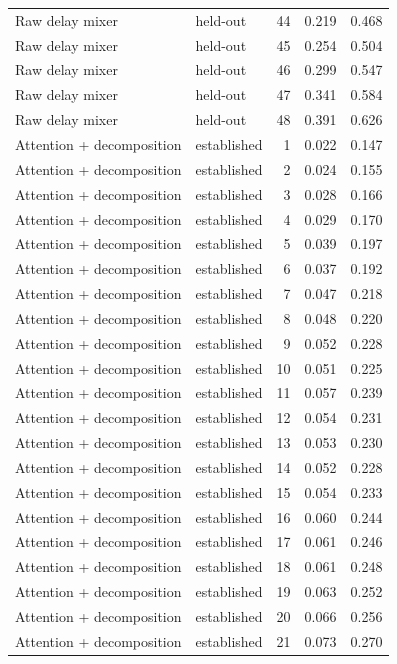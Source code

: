 \begin{tabular}{llrrr}
Raw delay mixer & held-out & 44 & 0.219 & 0.468 \\
Raw delay mixer & held-out & 45 & 0.254 & 0.504 \\
Raw delay mixer & held-out & 46 & 0.299 & 0.547 \\
Raw delay mixer & held-out & 47 & 0.341 & 0.584 \\
Raw delay mixer & held-out & 48 & 0.391 & 0.626 \\
Attention + decomposition & established & 1 & 0.022 & 0.147 \\
Attention + decomposition & established & 2 & 0.024 & 0.155 \\
Attention + decomposition & established & 3 & 0.028 & 0.166 \\
Attention + decomposition & established & 4 & 0.029 & 0.170 \\
Attention + decomposition & established & 5 & 0.039 & 0.197 \\
Attention + decomposition & established & 6 & 0.037 & 0.192 \\
Attention + decomposition & established & 7 & 0.047 & 0.218 \\
Attention + decomposition & established & 8 & 0.048 & 0.220 \\
Attention + decomposition & established & 9 & 0.052 & 0.228 \\
Attention + decomposition & established & 10 & 0.051 & 0.225 \\
Attention + decomposition & established & 11 & 0.057 & 0.239 \\
Attention + decomposition & established & 12 & 0.054 & 0.231 \\
Attention + decomposition & established & 13 & 0.053 & 0.230 \\
Attention + decomposition & established & 14 & 0.052 & 0.228 \\
Attention + decomposition & established & 15 & 0.054 & 0.233 \\
Attention + decomposition & established & 16 & 0.060 & 0.244 \\
Attention + decomposition & established & 17 & 0.061 & 0.246 \\
Attention + decomposition & established & 18 & 0.061 & 0.248 \\
Attention + decomposition & established & 19 & 0.063 & 0.252 \\
Attention + decomposition & established & 20 & 0.066 & 0.256 \\
Attention + decomposition & established & 21 & 0.073 & 0.270 \\

\end{tabular}
